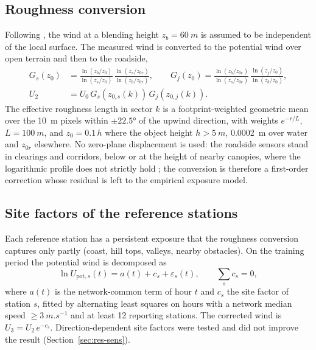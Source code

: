 \subsection{Roughness conversion}
Following \citet{Wieringa1986}, the wind at a blending height $z_b=\SI{60}{m}$ is assumed to be independent of the local surface. The measured wind is converted to the potential wind over open terrain and then to the roadside,
\begin{align}
G_s(z_0) &= \frac{\ln(z_b/z_0)}{\ln(z_s/z_0)}\,\frac{\ln(z_s/z_{0r})}{\ln(z_b/z_{0r})}, \qquad
G_j(z_0) = \frac{\ln(z_b/z_{0r})}{\ln(z_s/z_{0r})}\,\frac{\ln(z_j/z_0)}{\ln(z_b/z_0)},\\
U_2 &= U_0\,G_s\!\left(z_{0,s}(k)\right)\,G_j\!\left(z_{0,j}(k)\right).
\end{align}
The effective roughness length in sector $k$ is a footprint-weighted geometric mean over the \SI{10}{m} pixels within $\pm\ang{22.5}$ of the upwind direction, with weights $e^{-r/L}$, $L=\SI{100}{m}$, and $z_{0}=0.1\,h$ where the object height $h>\SI{5}{m}$, \SI{0.0002}{m} over water and $z_{0r}$ elsewhere. No zero-plane displacement is used: the roadside sensors stand in clearings and corridors, below or at the height of nearby canopies, where the logarithmic profile does not strictly hold \citep{Raupach1994,Finnigan2000}; the conversion is therefore a first-order correction whose residual is left to the empirical exposure model.

\subsection{Site factors of the reference stations}
Each reference station has a persistent exposure that the roughness conversion captures only partly (coast, hill tops, valleys, nearby obstacles). On the training period the potential wind is decomposed as
\begin{equation}
\ln U_{\mathrm{pot},s}(t) = a(t) + c_s + \varepsilon_{s}(t),\qquad \sum_s c_s=0,
\end{equation}
where $a(t)$ is the network-common term of hour $t$ and $c_s$ the site factor of station $s$, fitted by alternating least squares on hours with a network median speed $\ge\SI{3}{m.s^{-1}}$ and at least 12 reporting stations. The corrected wind is $U_3 = U_2\,e^{-c_s}$. Direction-dependent site factors were tested and did not improve the result (Section~\ref{sec:res-sens}).

